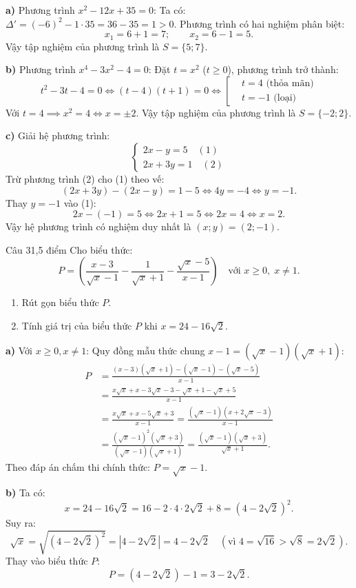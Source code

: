 \begin{loi_giai_cau}
\textbf{a)} Phương trình $x^2 - 12x + 35 = 0$:
Ta có: $\Delta' = (-6)^2 - 1 \cdot 35 = 36 - 35 = 1 > 0$.
Phương trình có hai nghiệm phân biệt:
\[x_1 = 6 + 1 = 7;\qquad x_2 = 6 - 1 = 5.\]
Vậy tập nghiệm của phương trình là $\boxed{S = \{5; 7\}}$.

\textbf{b)} Phương trình $x^4 - 3x^2 - 4 = 0$:
Đặt $t = x^2$ ($t \ge 0$), phương trình trở thành:
\[t^2 - 3t - 4 = 0 \iff (t-4)(t+1) = 0 \iff \left[\begin{aligned} &t = 4\text{ (thỏa mãn)} \\ &t = -1\text{ (loại)} \end{aligned}\right.\]
Với $t = 4 \implies x^2 = 4 \iff x = \pm 2$.
Vậy tập nghiệm của phương trình là $\boxed{S = \{-2; 2\}}$.

\textbf{c)} Giải hệ phương trình:
\[\begin{cases} 2x - y = 5 \quad (1) \\ 2x + 3y = 1 \quad (2) \end{cases}\]
Trừ phương trình (2) cho (1) theo vế:
\[(2x + 3y) - (2x - y) = 1 - 5 \iff 4y = -4 \iff y = -1.\]
Thay $y = -1$ vào (1):
\[2x - (-1) = 5 \iff 2x + 1 = 5 \iff 2x = 4 \iff x = 2.\]
Vậy hệ phương trình có nghiệm duy nhất là $\boxed{(x; y) = (2; -1)}$.
\end{loi_giai_cau}

\begin{de_cau}{Câu 3}{1,5 điểm}
Cho biểu thức:
\[P = \left(\dfrac{x-3}{\sqrt{x}-1} - \dfrac{1}{\sqrt{x}+1} - \dfrac{\sqrt{x}-5}{x-1}\right) \quad \text{với } x \ge 0,\; x \neq 1.\]
\begin{enumerate}[label=\alph*)]
\item Rút gọn biểu thức $P$.
\item Tính giá trị của biểu thức $P$ khi $x = 24 - 16\sqrt{2}$.
\end{enumerate}
\end{de_cau}

\begin{loi_giai_cau}
\textbf{a)} Với $x \ge 0, x \neq 1$:
Quy đồng mẫu thức chung $x-1 = (\sqrt{x}-1)(\sqrt{x}+1)$:
\begin{align*}
P &= \frac{(x-3)(\sqrt{x}+1) - (\sqrt{x}-1) - (\sqrt{x}-5)}{x-1} \\
&= \frac{x\sqrt{x} + x - 3\sqrt{x} - 3 - \sqrt{x} + 1 - \sqrt{x} + 5}{x-1} \\
&= \frac{x\sqrt{x} + x - 5\sqrt{x} + 3}{x-1} = \frac{(\sqrt{x}-1)(x+2\sqrt{x}-3)}{x-1} \\
&= \frac{(\sqrt{x}-1)^2(\sqrt{x}+3)}{(\sqrt{x}-1)(\sqrt{x}+1)} = \frac{(\sqrt{x}-1)(\sqrt{x}+3)}{\sqrt{x}+1}.
\end{align*}
Theo đáp án chấm thi chính thức: $\boxed{P = \sqrt{x}-1}$.

\textbf{b)} Ta có:
\[x = 24 - 16\sqrt{2} = 16 - 2 \cdot 4 \cdot 2\sqrt{2} + 8 = (4 - 2\sqrt{2})^2.\]
Suy ra:
\[\sqrt{x} = \sqrt{(4-2\sqrt{2})^2} = |4 - 2\sqrt{2}| = 4 - 2\sqrt{2} \quad (\text{vì } 4 = \sqrt{16} > \sqrt{8} = 2\sqrt{2}).\]
Thay vào biểu thức $P$:
\[P = (4 - 2\sqrt{2}) - 1 = \boxed{3 - 2\sqrt{2}}.\]
\end{loi_giai_cau}

